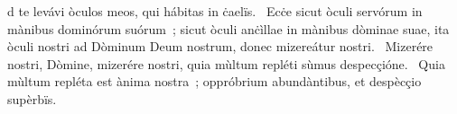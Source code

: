 \psalmChapterWithInscription{}
{ }
{%
d te levávi òculos meos, qui hábitas in ċaelïs. 
~Ecċe sicut òculi servórum in mànibus dominórum suórum~; sicut òculi anċìllae in mànibus dòminae suae, ita òculi nostri ad Dòminum Deum nostrum, donec mizereátur nostri. 
~Mizerére nostri, Dòmine, mizerére nostri, quia mùltum repléti sùmus despecçióne. 
~Quia mùltum repléta est ànima nostra~; oppróbrium abundàntibus, et despècçio supèrbïs. 
}
